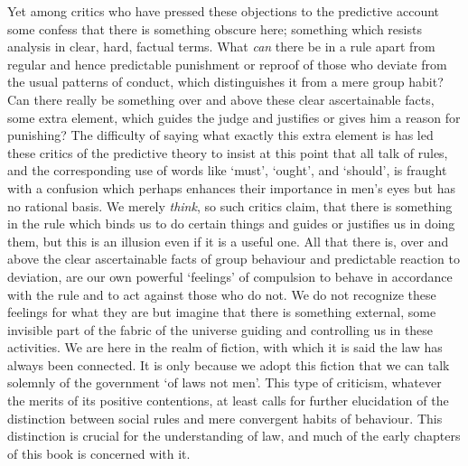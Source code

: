 Yet among critics who have pressed these objections to the predictive
account some confess that there is something obscure here; something
which resists analysis in clear, hard, factual terms. What \emph{can}
there be in a rule apart from regular and hence predictable punishment
or reproof of those who deviate from the usual patterns of conduct,
which distinguishes it from a mere group habit? Can there really be
something over and above these clear ascertainable facts, some extra
element, which guides the judge and justifies or gives him a reason for
punishing? The difficulty of saying what exactly this extra element is
has led these critics of the predictive theory to insist at this point
that all talk of rules, and the corresponding use of words like `must',
`ought', and `should', is fraught with a confusion which perhaps
enhances their importance in men's eyes but has no rational basis. We
merely \emph{think}, so such critics claim, that there is something in
the rule which binds us to do certain things and guides or justifies us
in doing them, but this is an illusion even if it is a useful one. All
that there is, over and above the clear ascertainable facts of group
behaviour and predictable reaction to deviation, are our own powerful
`feelings' of compulsion to behave in accordance with the rule and to
act against those who do not. We do not recognize these feelings for
what they are but imagine that there is something external, some
invisible part of the fabric of the universe guiding and controlling us
in these activities. We are here in the realm of fiction, with which it
is said the law has always been connected. It is only because we adopt
this fiction that we can talk solemnly of the government `of laws not
men'. This type of criticism, whatever the merits of its positive
contentions, at least calls for further elucidation of the distinction
between social rules and mere convergent habits of behaviour. This
distinction is crucial for the understanding of law, and much of the
early chapters of this book is concerned with it.

